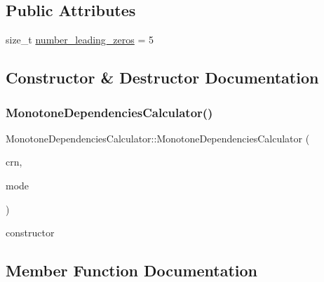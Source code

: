 \subsection*{Public Attributes}
\begin{DoxyCompactItemize}
\item 
size\+\_\+t \mbox{\hyperlink{classMonotoneDependenciesCalculator_ad44fd409a7a8d83d8c902cb2edb63ef6}{number\+\_\+leading\+\_\+zeros}} = 5
\end{DoxyCompactItemize}


\subsection{Constructor \& Destructor Documentation}
\mbox{\label{classMonotoneDependenciesCalculator_ad34f416980b165442b9b80b75d9589db}} 
\subsubsection{\texorpdfstring{Monotone\+Dependencies\+Calculator()}{MonotoneDependenciesCalculator()}}
{\footnotesize\ttfamily Monotone\+Dependencies\+Calculator\+::\+Monotone\+Dependencies\+Calculator (\begin{DoxyParamCaption}\item[{const \mbox{\hyperlink{classCRN}{C\+RN}} \&}]{crn,  }\item[{const size\+\_\+t}]{mode }\end{DoxyParamCaption})\hspace{0.3cm}{\ttfamily [inline]}}



constructor 



\subsection{Member Function Documentation}
\mbox{\label{classMonotoneDependenciesCalculator_ab848f6a0f7330fb11e18f13554a82152}} 
